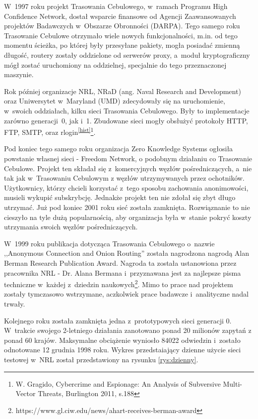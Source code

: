 W~1997 roku projekt Trasowania Cebulowego,  w~ramach Programu High Confidence Network, dostał wsparcie finansowe od Agencji Zaawansowanych projektów Badawczych w~Obszarze Obronności (DARPA). Tego samego roku Trasowanie Cebulowe otrzymało wiele nowych funkcjonalności, m.in. od tego momentu ścieżka, po której były przesyłane pakiety, mogła posiadać zmienną długość, routery zostały oddzielone od serwerów proxy, a~moduł kryptograficzny mógł zostać uruchomiony na oddzielnej, specjalnie do tego przeznaczonej maszynie. 

Rok później organizacje NRL,  NRaD (ang. Naval Research and Development) oraz Uniwersytet w~Maryland (UMD) zdecydowały się na uruchomienie, w~swoich oddziałach, kilku sieci Trasowania Cebulowego. Były to implementacje zarówno generacji~0, jak i~1. Zbudowane sieci mogły obsłużyć protokoły HTTP, FTP, SMTP, oraz rlogin\textsuperscript{\ref{hist}}\footnote{W. Gragido, Cybercrime and Espionage: An Analysis of Subversive Multi-Vector Threats, Burlington 2011, s.188}. 

Pod koniec tego samego roku organizacja Zero Knowledge Systems ogłosiła powstanie własnej sieci - Freedom Network, o podobnym działaniu co Trasowanie Cebulowe. Projekt ten składał się z~komercyjnych węzłów pośredniczących, a~nie tak jak w~Trasowaniu Cebulowym z węzłów utrzymywanych przez ochotników. Użytkownicy, którzy chcieli korzystać z~tego sposobu zachowania anonimowości, musieli wykupić subskrybcję. Jednakże projekt ten nie zdołał się zbyt długo utrzymać. Już pod koniec 2001 roku sieć została zamknięta. Rozwiąznanie to nie cieszyło na tyle dużą popularnością, aby organizacja była w~stanie pokryć koszty utrzymania swoich węzłów pośredniczących.

W~1999 roku publikacja dotycząca Trasowania Cebulowego o~nazwie ,,Anonymous Connection and Onion Routing'' została nagrodzona nagrodą Alan Berman Research Publication Award. Nagroda ta została ustanowiona przez pracownika NRL - Dr. Alana Bermana i~przyznawana jest za najlepsze pisma techniczne w~każdej z~dziedzin naukowych\footnote{https://www.gl.ciw.edu/news/ahart-receives-berman-award}. Mimo to prace nad projektem zostały tymczasowo wstrzymane, aczkolwiek prace badawcze i~analityczne nadal trwały.

Kolejnego roku została zamknięta jedna z~prototypowych sieci generacji 0. W~trakcie swojego 2-letniego działania zanotowano ponad 20 milionów zapytań z ponad 60 krajów. Maksymalne obciążenie wyniosło 84022 odwiedzin i~zostało odnotowane 12 grudnia 1998 roku. Wykres przedstaiający dzienne użycie sieci testowej w~NRL został przedstawiony na rysunku \ref{rys:dzienny}.

